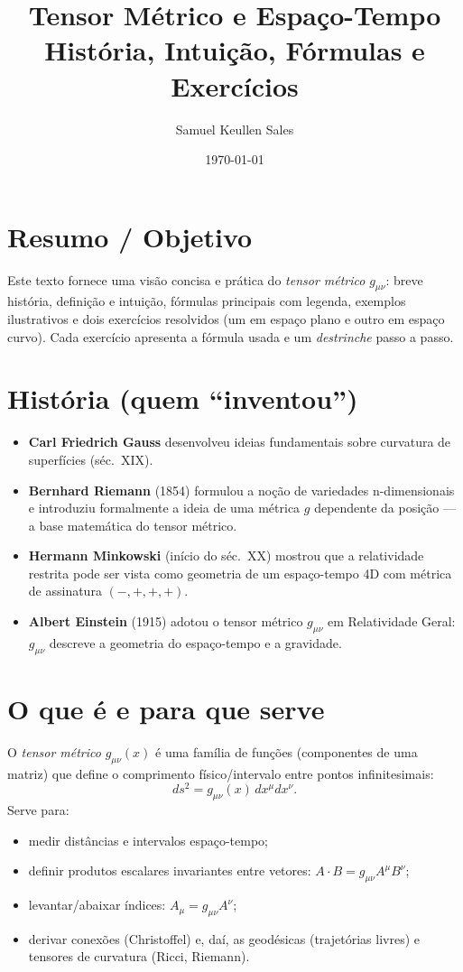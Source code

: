 \documentclass[11pt]{article}
\title{Tensor Métrico e Espaço-Tempo\\\large História, Intuição, Fórmulas e Exercícios}
\author{Samuel Keullen Sales}
\date{\today}
\begin{document}
\maketitle

\section*{Resumo / Objetivo}
Este texto fornece uma visão concisa e prática do \emph{tensor métrico} \(g_{\mu\nu}\): breve história, definição e intuição, fórmulas principais com legenda, exemplos ilustrativos e dois exercícios resolvidos (um em espaço plano e outro em espaço curvo). Cada exercício apresenta a fórmula usada e um \emph{destrinche} passo a passo.

\section{História (quem ``inventou'')}
\begin{itemize}
  \item \textbf{Carl Friedrich Gauss} desenvolveu ideias fundamentais sobre curvatura de superfícies (séc.\ XIX).
  \item \textbf{Bernhard Riemann} (1854) formulou a noção de variedades n-dimensionais e introduziu formalmente a ideia de uma métrica \(g\) dependente da posição — a base matemática do tensor métrico.
  \item \textbf{Hermann Minkowski} (início do séc.\ XX) mostrou que a relatividade restrita pode ser vista como geometria de um espaço-tempo 4D com métrica de assinatura $(-,+,+,+)$.
  \item \textbf{Albert Einstein} (1915) adotou o tensor métrico \(g_{\mu\nu}\) em Relatividade Geral: \(g_{\mu\nu}\) descreve a geometria do espaço-tempo e a gravidade.
\end{itemize}

\section{O que é e para que serve}
O \emph{tensor métrico} \(g_{\mu\nu}(x)\) é uma família de funções (componentes de uma matriz) que define o comprimento físico/intervalo entre pontos infinitesimais:
\[
ds^2 = g_{\mu\nu}(x)\,dx^\mu dx^\nu.
\]
Serve para:
\begin{itemize}
  \item medir distâncias e intervalos espaço-tempo;
  \item definir produtos escalares invariantes entre vetores: \(A\cdot B = g_{\mu\nu}A^\mu B^\nu\);
  \item levantar/abaixar índices: \(A_\mu = g_{\mu\nu}A^\nu\);
  \item derivar conexões (Christoffel) e, daí, as geodésicas (trajetórias livres) e tensores de curvatura (Ricci, Riemann).
\end{itemize}
\end{document}
